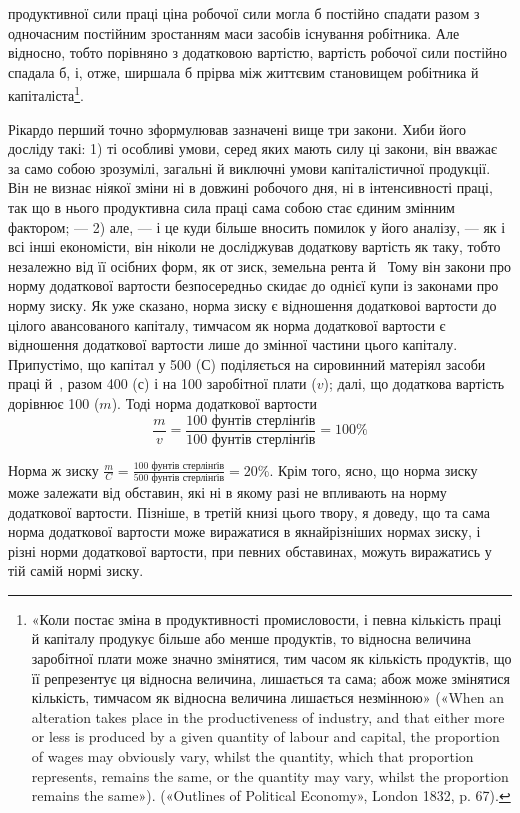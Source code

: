 \parcont{}  %
продуктивної сили праці ціна робочої сили могла б постійно
спадати разом з одночасним постійним зростанням маси засобів
існування робітника. Але відносно, тобто порівняно з додатковою
вартістю, вартість робочої сили постійно спадала б, і, отже,
ширшала б прірва між життєвим становищем робітника й капіталіста\footnote{
«Коли постає зміна в продуктивності промисловости, і певна
кількість праці й капіталу продукує більше або менше продуктів, то
відносна величина заробітної плати може значно змінятися, тим часом як
кількість продуктів, що її репрезентує ця відносна величина, лишається
та сама; абож може змінятися кількість, тимчасом як відносна
величина лишається незмінною» («When an alteration takes place in the productiveness
of industry, and that either more or less is produced by a given
quantity of labour and capital, the proportion of wages may obviously
vary, whilst the quantity, which that proportion represents, remains the
same, or the quantity may vary, whilst the proportion remains the same»).
(«Outlines of Political Economy», London 1832, p. 67).
}.

Рікардо перший точно зформулював зазначені вище три закони.
Хиби його досліду такі: 1) ті особливі умови, серед яких
мають силу ці закони, він вважає за само собою зрозумілі, загальні
й виключні умови капіталістичної продукції. Він не визнає
ніякої зміни ні в довжині робочого дня, ні в інтенсивності
праці, так що в нього продуктивна сила праці сама собою стає
єдиним змінним фактором; — 2) але, — і це куди більше вносить
помилок у його аналізу, — як і всі інші економісти, він ніколи
не досліджував додаткову вартість як таку, тобто незалежно
від її осібних форм, як от зиск, земельна рента й~ Тому
він закони про норму додаткової вартости безпосередньо скидає
до однієї купи із законами про норму зиску. Як уже сказано,
норма зиску є відношення додатковоі вартости до цілого
авансованого капіталу, тимчасом як норма додаткової вартости
є відношення додаткової вартости лише до змінної частини
цього капіталу. Припустімо, що капітал у 500
($С$) поділяється на сировинний матеріял засоби праці й~,
разом 400 ($с$) і на 100 заробітної
плати ($v$); далі, що додаткова вартість дорівнює 100 ($m$). Тоді норма додаткової вартости\[
   \frac{m}{v} = \frac{100\text{ фунтів стерлінґів}}{100\text{ фунтів стерлінґів}} = 100\%
\]

Норма ж зиску $ \frac{m}{C} = \frac{100\text{ фунтів стерлінґів}}{500\text{ фунтів стерлінґів}} = 20\%$. Крім того,
ясно, що норма зиску може залежати від обставин, які ні в якому
разі не впливають на норму додаткової вартости. Пізніше, в
третій книзі цього твору, я доведу, що та сама норма додаткової
вартости може виражатися в якнайрізніших нормах зиску, і
різні норми додаткової вартости, при певних обставинах, можуть
виражатись у тій самій нормі зиску.
